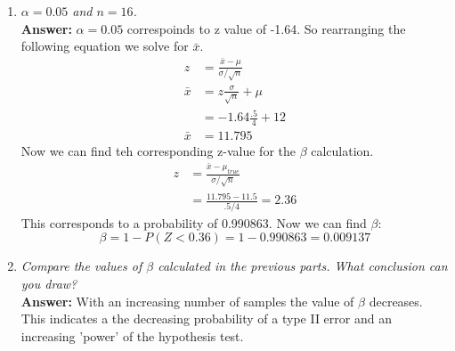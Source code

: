 \documentclass[11pt]{article}
\begin{document}
\begin{enumerate}
\item \emph{$\alpha = 0.05 $ and $n = 16$.}
\\\textbf{Answer:}
$\alpha = 0.05$ correspoinds to z value of -1.64. So rearranging the following equation we solve for $\bar{x}$.
\begin{equation}
\begin{split}
z &= \frac{\bar{x} - \mu}{\sigma/\sqrt{n}} \\
\bar{x} &= z\frac{\sigma}{\sqrt{n}} + \mu\\
&= -1.64\frac{.5}{4}+12 \\
\bar{x} &=11.795
\end{split}
\end{equation}
Now we can find teh corresponding z-value for the $\beta$ calculation.
\begin{equation}
\begin{split}
z &= \frac{\bar{x} - \mu_{true}}{\sigma/\sqrt{n}} \\
&= \frac{11.795 - 11.5}{.5/4} = 2.36
\end{split}
\end{equation}
This corresponds to a probability of 0.990863. Now we can find $\beta$:
\begin{equation}
\beta = 1 - P(Z < 0.36) = 1 - 0.990863 = 0.009137
\end{equation}
\item \emph{Compare the values of $\beta$ calculated in the previous parts.
What conclusion can you draw?}
\\\textbf{Answer:} With an increasing number of samples the value of $\beta$ decreases. This indicates a the decreasing probability of a type II error and an increasing 'power' of the hypothesis test.
\end{enumerate}
\end{document}
